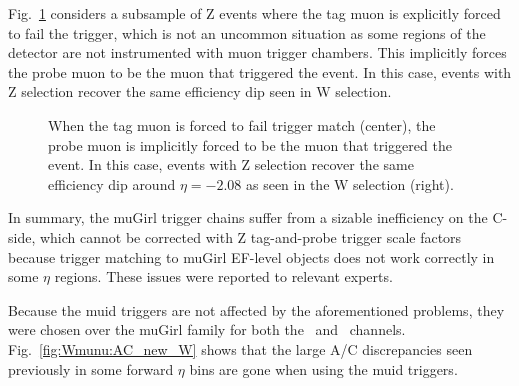 Fig.~\ref{fig:Wmunu:AC_tfail} considers a subsample of Z events where the tag muon is explicitly forced to fail the trigger, which is not an uncommon situation as some regions of the detector are not instrumented with muon trigger chambers. This implicitly forces the probe muon to be the muon that triggered the event. In this case, events with Z selection recover the same efficiency dip seen in W selection.

\begin{figure}[phtb]
  \begin{center}
 \caption{ When the tag muon is forced to fail trigger match (center), the probe muon is implicitly forced to be the muon that triggered the event. In this case, events with Z selection recover the same efficiency dip around $\eta=-2.08$ as seen in the W selection (right). }
 \label{fig:Wmunu:AC_tfail}
 \end{center}
\end{figure}

In summary, the muGirl trigger chains suffer from a sizable inefficiency on the C-side, which cannot be corrected with Z tag-and-probe trigger scale factors because trigger matching to muGirl EF-level objects does not work correctly in some $\eta$ regions. These issues were reported to relevant experts.

Because the muid triggers are not affected by the aforementioned problems, they were chosen over the muGirl family for both the \Wmn\ and \Zmm\ channels. Fig.~\ref{fig:Wmunu:AC_new_W} shows that the large A/C discrepancies seen previously in some forward $\eta$ bins are gone when using the muid triggers.

